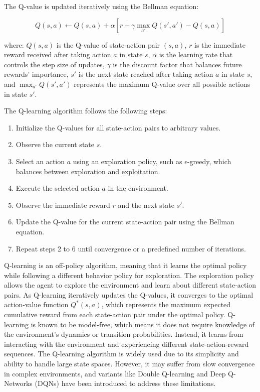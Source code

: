 The Q-value is updated iteratively using the Bellman equation:

\[Q(s, a) \leftarrow Q(s, a) + \alpha \left[ r + \gamma \max_{a'} Q(s', a') - Q(s, a) \right]\]

where:
\(Q(s, a)\) is the Q-value of state-action pair \((s, a)\),
\(r\) is the immediate reward received after taking action \(a\) in state \(s\),
\(\alpha\) is the learning rate that controls the step size of updates,
\(\gamma\) is the discount factor that balances future rewards' importance,
\(s'\) is the next state reached after taking action \(a\) in state \(s\), and
\(\max_{a'} Q(s', a')\) represents the maximum Q-value over all possible actions in state \(s'\).

The Q-learning algorithm follows the following steps:
\begin{enumerate}
    \item Initialize the Q-values for all state-action pairs to arbitrary values.
    \item Observe the current state \(s\).
    \item Select an action \(a\) using an exploration policy, such as \(\epsilon\)-greedy, which balances between exploration and exploitation.
    \item Execute the selected action \(a\) in the environment.
    \item Observe the immediate reward \(r\) and the next state \(s'\).
    \item Update the Q-value for the current state-action pair using the Bellman equation.
    \item Repeat steps 2 to 6 until convergence or a predefined number of iterations.
\end{enumerate}
Q-learning is an off-policy algorithm, meaning that it learns the optimal policy while following a different behavior policy for exploration. The exploration policy allows the agent to explore the environment and learn about different state-action pairs.
As Q-learning iteratively updates the Q-values, it converges to the optimal action-value function \(Q^*(s, a)\), which represents the maximum expected cumulative reward from each state-action pair under the optimal policy.
Q-learning is known to be model-free, which means it does not require knowledge of the environment's dynamics or transition probabilities. Instead, it learns from interacting with the environment and experiencing different state-action-reward sequences.
The Q-learning algorithm is widely used due to its simplicity and ability to handle large state spaces. However, it may suffer from slow convergence in complex environments, and variants like Double Q-learning and Deep Q-Networks (DQNs) have been introduced to address these limitations.


